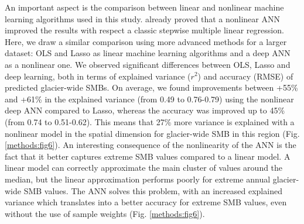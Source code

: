 An important aspect is the comparison between linear and nonlinear machine learning algorithms used in this study. \citet{steiner_application_2005} already proved that a nonlinear ANN improved the results with respect a classic stepwise multiple linear regression. Here, we draw a similar comparison using more advanced methods for a larger dataset: OLS and Lasso as linear machine learning algorithms and a deep ANN as a nonlinear one. We observed significant differences between OLS, Lasso and deep learning, both in terms of explained variance (\(r^2\)) and accuracy (RMSE) of predicted glacier-wide SMBs. On average, we found improvements between +55\% and +61\% in the explained variance (from 0.49 to 0.76-0.79) using the nonlinear deep ANN compared to Lasso, whereas the accuracy was improved up to 45\% (from 0.74 to 0.51-0.62). This means that 27\% more variance is explained with a nonlinear model in the spatial dimension for glacier-wide SMB in this region (Fig. \ref{methods:fig6}). An interesting consequence of the nonlinearity of the ANN is the fact that it better captures extreme SMB values compared to a linear model. A linear model can correctly approximate the main cluster of values around the median, but the linear approximation performs poorly for extreme annual glacier-wide SMB values. The ANN solves this problem, with an increased explained variance which translates into a better accuracy for extreme SMB values, even without the use of sample weights (Fig. \ref{methods:fig6}). 

